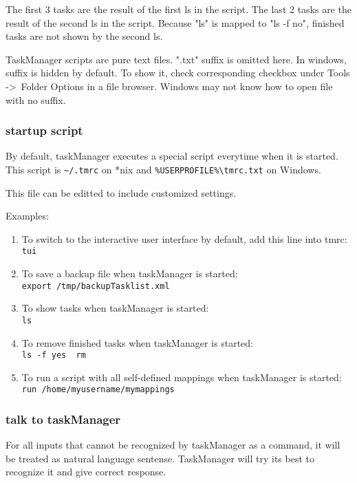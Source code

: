 \documentclass[12pt, a4paper]{article}
\begin{document}
The first 3 tasks are the result of the first ls in the script. The last 2 tasks are the result of the second ls in the script. Because "ls" is mapped to "ls -f no", finished tasks are not shown by the second ls.

TaskManager scripts are pure text files. ".txt" suffix is omitted here. In windows, suffix is hidden by default. To show it, check corresponding checkbox under Tools -\textgreater \ Folder Options in a file browser.
Windows may not know how to open file with no suffix.

\subsubsection{startup script}

By default, taskManager executes a special script everytime when it is started. 
This script is \texttt{\~{}/.tmrc} on *nix and \texttt{\%USERPROFILE\%\textbackslash tmrc.txt} on Windows.

This file can be editted to include customized settings.

Examples:
\begin{enumerate}
\item To switch to the interactive user interface by default, add this line into tmrc:\\
  \texttt{tui}

\item To save a backup file when taskManager is started:\\
  \texttt{export /tmp/backupTasklist.xml}

\item To show tasks when taskManager is started:\\
  \texttt{ls}

\item To remove finished tasks when taskManager is started:\\
  \texttt{ls -f yes \textbar \  rm}

\item To run a script with all self-defined mappings when taskManager is started:\\
  \texttt{run /home/myusername/mymappings}
\end{enumerate}

\subsubsection{talk to taskManager}

For all inputs that cannot be recognized by taskManager as a command, it will be treated as natural language sentense. 
TaskManager will try its best to recognize it and give correct response.
\end{document}
